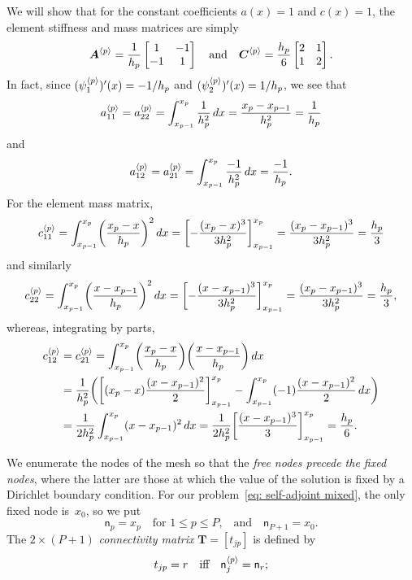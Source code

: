 \begin{example}\label{example: linear elt matrix 1d}
We will show that for the constant coefficients $a(x)=1$ and $c(x)=1$, the
element stiffness and mass matrices are simply
\[
\boldsymbol{A}^{\langle p\rangle}=\frac{1}{h_p}\begin{bmatrix}1&-1\\ -1&1\end{bmatrix}
\quad\text{and}\quad
\boldsymbol{C}^{\langle p\rangle}=\frac{h_p}{6}\begin{bmatrix}2&1\\ 1&2\end{bmatrix}.
\]
In fact, since $(\psi^{\langle p\rangle}_1)'(x)=-1/h_p$ and 
$(\psi^{\langle p\rangle}_2)'(x)=1/h_p$, we see that
\[
a^{\langle p\rangle}_{11}=a^{\langle p\rangle}_{22}
    =\int_{x_{p-1}}^{x_p}\frac{1}{h_p^2}\,dx
    =\frac{x_p-x_{p-1}}{h_p^2}=\frac{1}{h_p}
\]
and
\[
a^{\langle p\rangle}_{12}=a^{\langle p\rangle}_{21}
    =\int_{x_{p-1}}^{x_p}\frac{-1}{h_p^2}\,dx=\frac{-1}{h_p}.
\]
For the element mass matrix,
\[
c^{\langle p\rangle}_{11}=\int_{x_{p-1}}^{x_p}\biggl(\frac{x_p-x}{h_p}\biggr)^2\,dx
    =\biggl[-\frac{(x_p-x)^3}{3h_p^2}\biggr]_{x_{p-1}}^{x_p}
    =\frac{(x_p-x_{p-1})^3}{3h_p^2}=\frac{h_p}{3}
\]
and similarly
\[
c^{\langle p\rangle}_{22}=\int_{x_{p-1}}^{x_p}\biggl(\frac{x-x_{p-1}}{h_p}\biggr)^2\,dx
    =\biggl[-\frac{(x-x_{p-1})^3}{3h_p^2}\biggr]_{x_{p-1}}^{x_p}
    =\frac{(x_p-x_{p-1})^3}{3h_p^2}=\frac{h_p}{3},
\]
whereas, integrating by parts,
\begin{align*}
c^{\langle p\rangle}_{12}&=c^{\langle p\rangle}_{21}=\int_{x_{p-1}}^{x_p}
    \biggl(\frac{x_p-x}{h_p}\biggr)\biggl(\frac{x-x_{p-1}}{h_p}\biggr)\,dx\\
    &=\frac{1}{h_p^2}\biggl(
    \biggl[(x_p-x)\frac{(x-x_{p-1})^2}{2}\biggr]_{x_{p-1}}^{x_p}
    -\int_{x_{p-1}}^{x_p}(-1)\frac{(x-x_{p-1})^2}{2}\,dx\biggr)\\
    &=\frac{1}{2h_p^2}\int_{x_{p-1}}^{x_p}(x-x_{p-1})^2\,dx
    =\frac{1}{2h_p^2}\biggl[\frac{(x-x_{p-1})^3}{3}\biggr]_{x_{p-1}}^{x_p}
    =\frac{h_p}{6}.
\end{align*}
\end{example}

We enumerate the nodes of the mesh so that the \emph{free nodes precede 
the fixed nodes}, where the latter are those at which the value of the 
solution is fixed by a Dirichlet boundary condition.  For our 
problem~\eqref{eq: self-adjoint mixed}, the only fixed node is~$x_0$, so we put
\[
\mathsf{n}_p=x_p\quad\text{for $1\le p\le P$,}
\quad\text{and}\quad\mathsf{n}_{P+1}=x_0.
\]
The $2\times(P+1)$ \emph{connectivity matrix} $\boldsymbol{T}=[t_{jp}]$ is 
defined by
\begin{equation}\label{eq: e pm def}
t_{jp}=r\quad\text{iff}\quad\mathsf{n}^{\langle p\rangle}_j=\mathsf{n}_r;
\end{equation}

